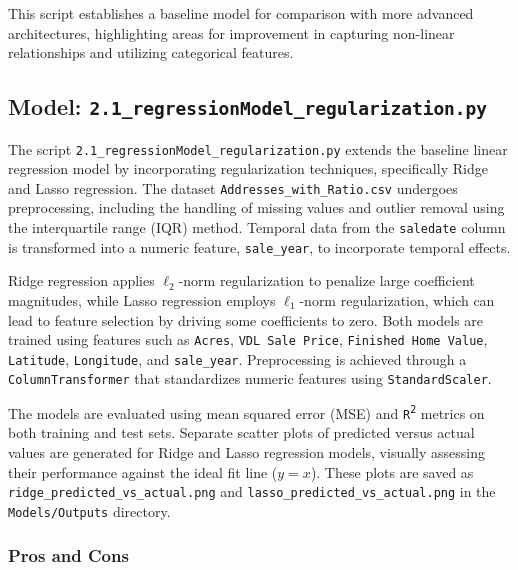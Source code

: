 This script establishes a baseline model for comparison with more advanced architectures, highlighting areas for improvement in capturing non-linear relationships and utilizing categorical features. \\

\hrulefill

\subsection{Model: \texttt{2.1\_regressionModel\_regularization.py}}

The script \texttt{2.1\_regressionModel\_regularization.py} extends the baseline linear regression model by incorporating regularization techniques, specifically Ridge and Lasso regression. The dataset \texttt{Addresses\_with\_Ratio.csv} undergoes preprocessing, including the handling of missing values and outlier removal using the interquartile range (IQR) method. Temporal data from the \texttt{saledate} column is transformed into a numeric feature, \texttt{sale\_year}, to incorporate temporal effects.

Ridge regression applies \(\ell_2\)-norm regularization to penalize large coefficient magnitudes, while Lasso regression employs \(\ell_1\)-norm regularization, which can lead to feature selection by driving some coefficients to zero. Both models are trained using features such as \texttt{Acres}, \texttt{VDL Sale Price}, \texttt{Finished Home Value}, \texttt{Latitude}, \texttt{Longitude}, and \texttt{sale\_year}. Preprocessing is achieved through a \texttt{ColumnTransformer} that standardizes numeric features using \texttt{StandardScaler}.

The models are evaluated using mean squared error (MSE) and \texttt{R\textsuperscript{2}} metrics on both training and test sets. Separate scatter plots of predicted versus actual values are generated for Ridge and Lasso regression models, visually assessing their performance against the ideal fit line (\(y = x\)). These plots are saved as \texttt{ridge\_predicted\_vs\_actual.png} and \texttt{lasso\_predicted\_vs\_actual.png} in the \texttt{Models/Outputs} directory.

\subsubsection*{Pros and Cons}

